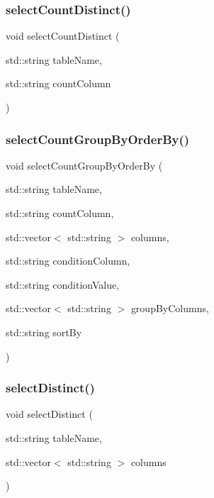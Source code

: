 \mbox{\label{sqllib_8hpp_a8d6f770e3b1eb29fce843172c187ccc6}} 
\subsubsection{select\+Count\+Distinct()}
{\footnotesize\ttfamily void select\+Count\+Distinct (\begin{DoxyParamCaption}\item[{std\+::string}]{table\+Name,  }\item[{std\+::string}]{count\+Column }\end{DoxyParamCaption})}

\mbox{\label{sqllib_8hpp_a851bc3e6b04b4dfaa359b43534a37cd5}} 
\subsubsection{select\+Count\+Group\+By\+Order\+By()}
{\footnotesize\ttfamily void select\+Count\+Group\+By\+Order\+By (\begin{DoxyParamCaption}\item[{std\+::string}]{table\+Name,  }\item[{std\+::string}]{count\+Column,  }\item[{std\+::vector$<$ std\+::string $>$}]{columns,  }\item[{std\+::string}]{condition\+Column,  }\item[{std\+::string}]{condition\+Value,  }\item[{std\+::vector$<$ std\+::string $>$}]{group\+By\+Columns,  }\item[{std\+::string}]{sort\+By }\end{DoxyParamCaption})}

\mbox{\label{sqllib_8hpp_aba13caf613af9f91f2a2f1a8f9d49967}} 
\subsubsection{select\+Distinct()}
{\footnotesize\ttfamily void select\+Distinct (\begin{DoxyParamCaption}\item[{std\+::string}]{table\+Name,  }\item[{std\+::vector$<$ std\+::string $>$}]{columns }\end{DoxyParamCaption})}

